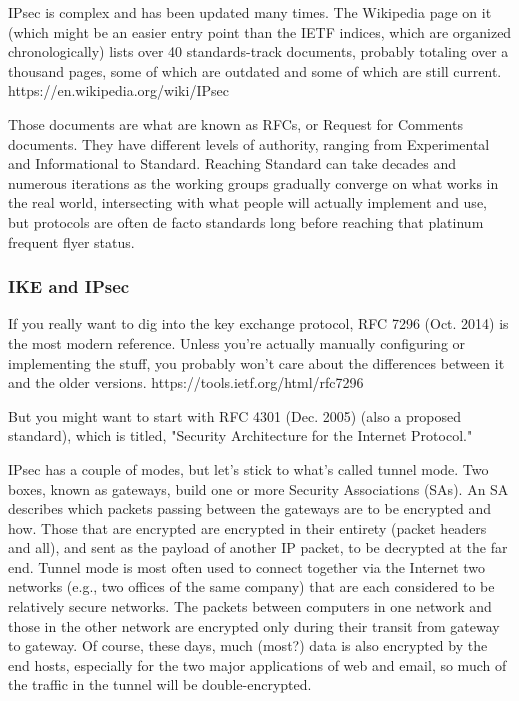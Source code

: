 \documentclass[%
 aip,
 jmp,%
 amsmath,amssymb,
 reprint,%
]{revtex4-1}
\begin{document}
IPsec is complex and has been updated many times.  The Wikipedia page
on it (which might be an easier entry point than the IETF indices,
which are organized chronologically) lists over 40 standards-track
documents, probably totaling over a thousand pages, some of which are
outdated and some of which are still current.
https://en.wikipedia.org/wiki/IPsec

Those documents are what are known as RFCs, or Request for Comments
documents.  They have different levels of authority, ranging from
Experimental and Informational to Standard.  Reaching Standard can
take decades and numerous iterations as the working groups gradually
converge on what works in the real world, intersecting with what
people will actually implement and use, but protocols are often de
facto standards long before reaching that platinum frequent flyer
status.

\subsubsection{IKE and IPsec}

If you really want to dig into the key exchange protocol, RFC 7296
(Oct. 2014) is the most modern reference.  Unless you're actually
manually configuring or implementing the stuff, you probably won't
care about the differences between it and the older versions.
https://tools.ietf.org/html/rfc7296

But you might want to start with RFC 4301 (Dec. 2005) (also a proposed
standard), which is titled, "Security Architecture for the Internet
Protocol."

IPsec has a couple of modes, but let's stick to what's called tunnel
mode.  Two boxes, known as gateways, build one or more Security
Associations (SAs). An SA describes which packets passing between the
gateways are to be encrypted and how.  Those that are encrypted are
encrypted in their entirety (packet headers and all), and sent as the
payload of another IP packet, to be decrypted at the far end.  Tunnel
mode is most often used to connect together via the Internet two
networks (e.g., two offices of the same company) that are each
considered to be relatively secure networks.  The packets between
computers in one network and those in the other network are encrypted
only during their transit from gateway to gateway.  Of course, these
days, much (most?) data is also encrypted by the end hosts, especially
for the two major applications of web and email, so much of the
traffic in the tunnel will be double-encrypted.
\end{document}
